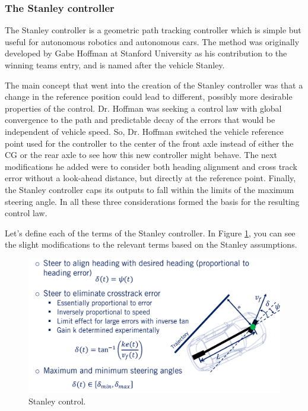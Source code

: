 \subsubsection{The Stanley controller}

The Stanley controller is a geometric path tracking controller which is simple but useful for autonomous robotics and autonomous cars. 
The method was originally developed by Gabe Hoffman at Stanford University as 
his contribution to the winning teams entry, and is named after the vehicle Stanley. 

The main concept that went into the creation of the Stanley controller was that a change in the reference position could lead to different, 
possibly more desirable properties of the control. Dr. Hoffman was seeking a control law with global convergence to the path and predictable 
decay of the errors that would be independent of vehicle speed. So, Dr. Hoffman switched the vehicle reference point used for the controller 
to the center of the front axle instead of either the CG or the rear axle to see how this new controller might behave. 
The next modifications he added were to consider both heading alignment and cross track error without a look-ahead distance, 
but directly at the reference point. Finally, the Stanley controller caps its outputs to fall within the limits of the maximum steering angle. 
In all these three considerations formed the basis for the resulting control law. 

Let's define each of the terms of the Stanley controller. In Figure \ref{stanley_control}, you can see the slight modifications to the relevant terms based on the Stanley assumptions. 

\begin{figure}[!htb]
\begin{center}
\includegraphics[scale=0.280]{img/lateral_control/stanley_control.jpeg}
\end{center}
\caption{Stanley control.}
\label{stanley_control}
\end{figure}

